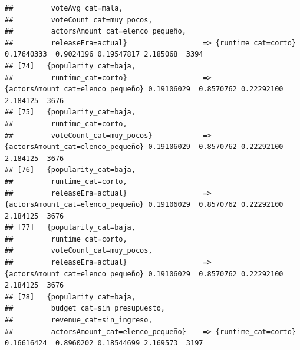 \documentclass[
]{article}
\begin{document}
\begin{verbatim}
##         voteAvg_cat=mala,                                                                                                       
##         voteCount_cat=muy_pocos,                                                                                                
##         actorsAmount_cat=elenco_pequeño,                                                                                        
##         releaseEra=actual}                  => {runtime_cat=corto}               0.17640333  0.9024196 0.19547817 2.185068  3394
## [74]   {popularity_cat=baja,                                                                                                    
##         runtime_cat=corto}                  => {actorsAmount_cat=elenco_pequeño} 0.19106029  0.8570762 0.22292100 2.184125  3676
## [75]   {popularity_cat=baja,                                                                                                    
##         runtime_cat=corto,                                                                                                      
##         voteCount_cat=muy_pocos}            => {actorsAmount_cat=elenco_pequeño} 0.19106029  0.8570762 0.22292100 2.184125  3676
## [76]   {popularity_cat=baja,                                                                                                    
##         runtime_cat=corto,                                                                                                      
##         releaseEra=actual}                  => {actorsAmount_cat=elenco_pequeño} 0.19106029  0.8570762 0.22292100 2.184125  3676
## [77]   {popularity_cat=baja,                                                                                                    
##         runtime_cat=corto,                                                                                                      
##         voteCount_cat=muy_pocos,                                                                                                
##         releaseEra=actual}                  => {actorsAmount_cat=elenco_pequeño} 0.19106029  0.8570762 0.22292100 2.184125  3676
## [78]   {popularity_cat=baja,                                                                                                    
##         budget_cat=sin_presupuesto,                                                                                             
##         revenue_cat=sin_ingreso,                                                                                                
##         actorsAmount_cat=elenco_pequeño}    => {runtime_cat=corto}               0.16616424  0.8960202 0.18544699 2.169573  3197

\end{verbatim}
\end{document}
